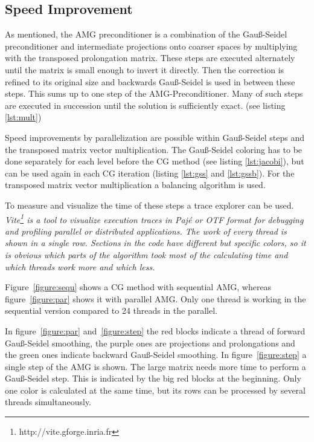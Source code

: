 \documentclass[a4paper,11pt]{scrartcl}
\begin{document}
\subsection{Speed Improvement}
As mentioned, the AMG preconditioner is a combination of the Gauß-Seidel
preconditioner and intermediate projections onto coarser spaces
by multiplying with the transposed prolongation matrix. These steps are
executed alternately until the matrix is small enough to invert it directly.
Then the correction is refined to its original size and backwards Gauß-Seidel is
used in between these steps.
This sums up to one step of the AMG-Preconditioner. Many of such steps are
executed in succession until the solution is sufficiently exact. (see listing \ref{lst:mult})

Speed improvements by parallelization are possible within Gauß-Seidel steps
and the transposed matrix vector multiplication. The Gauß-Seidel coloring has to
be done separately for each level before the CG method (see listing \ref{lst:jacobi}),
 but can be used again
in each CG iteration (listing \ref{lst:gss} and \ref{lst:gssb}). For the transposed matrix vector multiplication a balancing algorithm is used.

To measure and visualize the time of these steps a trace explorer can be used. \em Vite\em\footnote{http://vite.gforge.inria.fr} is a tool to visualize execution traces in Pajé
 or OTF format for debugging and profiling parallel or distributed applications. 
The work of every thread is shown in a single row. Sections in the code have different but specific
colors, so it is obvious which parts of the algorithm took most of the calculating time and
which threads work more and which less.


Figure~\ref{figure:sequ} shows a CG method with sequential AMG, whereas
figure~\ref{figure:par} shows it with parallel AMG\@.
Only one thread is working in the sequential version compared to 24 threads in
the parallel.

In figure~\ref{figure:par} and~\ref{figure:step} the red blocks indicate a
thread of forward Gauß-Seidel smoothing, the purple ones are projections and
prolongations and the green ones indicate backward Gauß-Seidel smoothing.
In figure~\ref{figure:step} a single step of the AMG is shown. The large matrix
needs more time to perform a Gauß-Seidel step.
This is indicated by the big red blocks at the beginning. Only one color is
calculated at the same time, but its rows can be processed by several threads
simultaneously.
\end{document}
